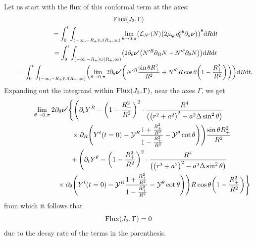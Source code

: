\documentclass[11pt]{article}
\numberwithin{equation}{section}
\def\ptl{\partial}%
\def\mbo#1{\boldsymbol{#1}}%
\numberwithin{equation}{section}
\begin{document}
Let us start with the flux of this conformal term at the axes:
\begin{gather*}
 {\rm Flux} (J_3, \Gamma) \\
 \qquad{} = \int^t_0 \int_{(-\infty, -R_+) \cup (R_+, \infty)} \lim_{\theta \to 0, \pi} \bigl(\mathcal{L}_{N'} (N) \bigl(2 \bar{\mu}_{q_0}q^{ab}_0 \ptl_a \mbo{\nu}\bigr) \bigr)^\theta {\rm d}R {\rm d}t \notag\\
 \qquad{} = \int^t_0 \int_{(-\infty, -R_+) \cup (R_+, \infty)} \bigl( 2 \ptl_\theta \mbo{\nu}' \bigl(N'^R \ptl_R N + N'^\theta \ptl_\theta N\bigr) \bigr) {\rm d}R {\rm d}t \notag\\
 \qquad{} = \int^t_0 \int_{(-\infty, -R_+) \cup (R_+, \infty)} \biggl(\lim_{\theta \to 0, \pi} 2 \ptl_\theta \mbo{\nu}' \biggl(N'^R \frac{\sin \theta R^2_+}{R^2} + N'^\theta R \cos \theta\biggl(1-\frac{R^2_+}{R^2} \biggr) \biggr)\biggr) {\rm d}R {\rm d}t.
\end{gather*}
Expanding out the integrand within ${\rm Flux} (J_3, \Gamma) $, near the axes $\Gamma$, we get
\begin{gather*}
 \lim_{\theta \to 0, \pi} 2 \ptl_\theta \mbo{\nu}' \Biggl\{ \Biggl(\ptl_t Y^R -\biggl(1 - \frac{R^2_+}{R^2} \biggr)^2 \cdot \frac{R^4}{ \bigl(\bigl(r^2+a^2\bigr)^2 -a^2 \Delta \sin^2 \theta\bigr)} \notag\\
 \hphantom{\lim_{\theta \to 0, \pi} 2 \ptl_\theta \mbo{\nu}' \Biggl\{ \Biggl(}{}
 \times \ptl_R \Biggl(Y^t(t=0) - \mathcal{Y}^R \frac{1+ \frac{R^2_+}{R^2}}{1-\frac{R^2_+}{R^2}} - \mathcal{Y}^\theta \cot \theta \Biggr) \Biggr)\frac{\sin \theta R^2_+}{R^2} \notag\\
\hphantom{ \lim_{\theta \to 0, \pi} 2 \ptl_\theta \mbo{\nu}' \Biggl\{}{} + \Biggl(\ptl_t Y^\theta - \biggl(1- \frac{R^2_+}{R^2}\biggr)^2 \cdot \frac{R^4}{ \bigl(\bigl(r^2+a^2\bigr)^2 -a^2 \Delta
	\sin^2 \theta \bigr)} \notag\\
\hphantom{ \lim_{\theta \to 0, \pi} 2 \ptl_\theta \mbo{\nu}' \Biggl\{ +\Biggl(}{} \times \ptl_\theta \Biggl(Y^t (t=0) - \mathcal{Y}^R \frac{1 + \frac{R^2_+}{R^2}} {{1-\frac{R^2_+}{R^2}} } - \mathcal{Y}^ \theta \cot \theta \Biggr) \Biggr) R \cos \theta \biggl(1-\frac{R^2_+}{R^2}\biggr) \Biggr\}
\end{gather*}
from which it follows that
\[
{\rm Flux} (J_3, \Gamma)= 0
\]
due to the decay rate of the terms in the parenthesis.
\end{document}
